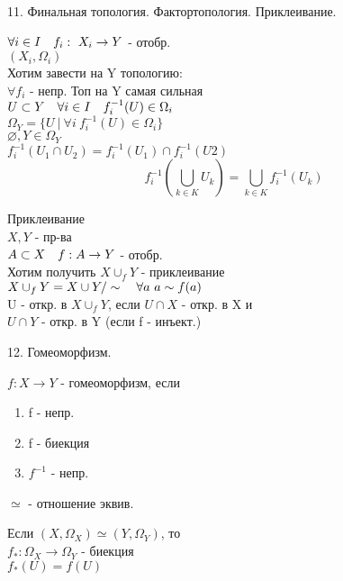 \documentclass[11pt, fleqn]{article}
\begin{document}
    \begin{question}{11. Финальная топология. Фактортопология. Приклеивание.}
        \begin{definition} 
            $\forall i \in I \quad f_i: \ X_i \rightarrow Y$ - отобр.\\
            $(X_i, \Omega_i)$\\
            Хотим завести на Y топологию:\\
            $\forall f_i$ - непр. Топ на Y самая сильная \\
            $U \subset Y \quad \forall i \in I \quad f_i^{-1}(U) \in \Omega_i$\\
            $\Omega_Y = \{U \ | \ \forall i \ f_i^{-1}(U) \in \Omega_i\}$\\
            $\varnothing, Y \in \Omega_Y$\\
            $f_i^{-1}(U_1 \cap U_2) = f_i^{-1}(U_1) \cap f_i^{-1}(U2)$\\
            \[f_i^{-1}(\bigcup_{k \in K} U_k) = \bigcup_{k \in K} f_i^{-1}(U_k)\]
        \end{definition}

        \begin{example} 
            Приклеивание\\
            $X, Y$ - пр-ва\\
            $A \subset X \quad f: A \rightarrow Y$ - отобр.\\
            Хотим получить $X \cup_f Y$ - приклеивание\\
            $X \cup_f Y = X \cup Y /\sim \quad \forall a \ a \sim f(a)$\\
            U - откр. в $X \cup_f Y$, если $U \cap X$ - откр. в X и\\ $U \cap Y$ - откр. в Y 
            (если f - инъект.)
        \end{example}
    \end{question}

    \begin{question}{12. Гомеоморфизм.}
        \begin{definition} 
            $f: X \rightarrow Y$ - гомеоморфизм, если\\
            \begin{enumerate}
                \item f - непр.
                \item f - биекция
                \item $f^{-1}$ - непр.
            \end{enumerate}
        \end{definition}

        \begin{hypothesis} 
            $\simeq$ - отношение эквив.
        \end{hypothesis}

        \begin{theorem} 
            Если $(X, \Omega_X) \simeq (Y, \Omega_Y)$, то\\
            $f_*: \Omega_X \rightarrow \Omega_Y$ - биекция\\
            $f_*(U) = f(U)$
        \end{theorem}
    \end{question}
\end{document}
